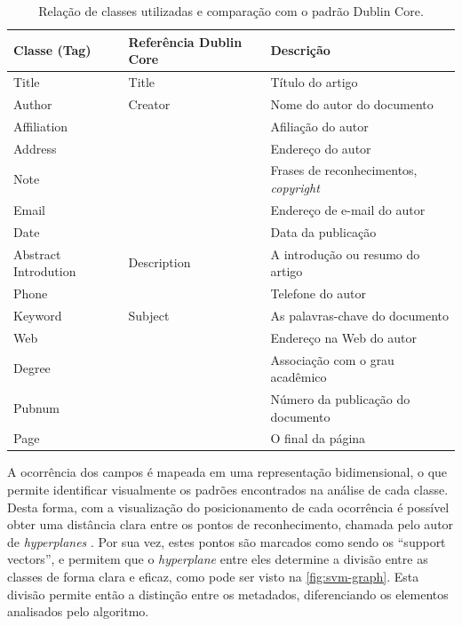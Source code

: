 \begin{table}[h!]
    \caption{Relação de classes utilizadas e comparação com o padrão Dublin Core.}
    \begin{center}
        \begin{tabular}{|C{3cm}|C{3cm}|p{7cm}|}
            \hline \textbf{Classe (Tag)} & \textbf{Referência Dublin Core} & \textbf{Descrição}\\ 
            \hline Title & Title & Título do artigo\\
            \hline Author & Creator & Nome do autor do documento\\
            \hline Affiliation & & Afiliação do autor\\
            \hline Address & & Endereço do autor\\
            \hline Note & & Frases de reconhecimentos, \textit{copyright}\\
            \hline Email & & Endereço de e-mail do autor\\
            \hline Date & & Data da publicação\\
            \hline Abstract Introdution & Description & A introdução ou resumo do artigo\\
            \hline Phone & & Telefone do autor\\
            \hline Keyword & Subject & As palavras-chave do documento\\
            \hline Web & & Endereço na Web do autor\\
            \hline Degree & & Associação com o grau acadêmico\\
            \hline Pubnum & & Número da publicação do documento\\
            \hline Page & & O final da página\\
            \hline
        \end{tabular}
    \end{center}
    \label{tab:svm-classes}
\end{table}

A ocorrência dos campos é mapeada em uma representação bidimensional, o que permite identificar visualmente os padrões encontrados na análise de cada classe. Desta forma, com a visualização do posicionamento de cada ocorrência é possível obter uma distância clara entre os pontos de reconhecimento, chamada pelo autor de \textit{hyperplanes} \cite{Vapnik-SVM}. Por sua vez, estes pontos são marcados como sendo os ``support vectors'', e permitem que o \textit{hyperplane} entre eles determine a divisão entre as classes de forma clara e eficaz, como pode ser visto na \autoref{fig:svm-graph}. Esta divisão permite então a distinção entre os metadados, diferenciando os elementos analisados pelo algoritmo.

